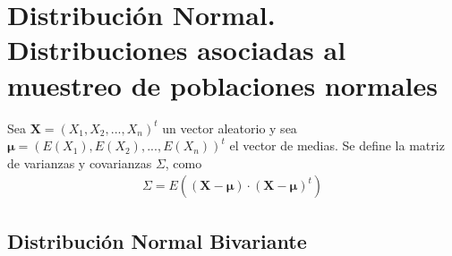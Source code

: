 \chapter{Distribución Normal. Distribuciones asociadas al muestreo de poblaciones normales}

\begin{defi}
Sea $\textbf{X} = (X_1,X_2,...,X_n)^t$ un vector aleatorio y sea \\ $\boldsymbol{\mu} = (E(X_1),E(X_2),...,E(X_n))^t$ el vector de medias. Se define la matriz de varianzas y covarianzas $\Sigma$, como
\begin{align*}
    \Sigma = E((\textbf{X} - \boldsymbol{\mu}) \cdot (\textbf{X} - \boldsymbol{\mu})^t)
\end{align*}
\end{defi}

\section{Distribución Normal Bivariante}

